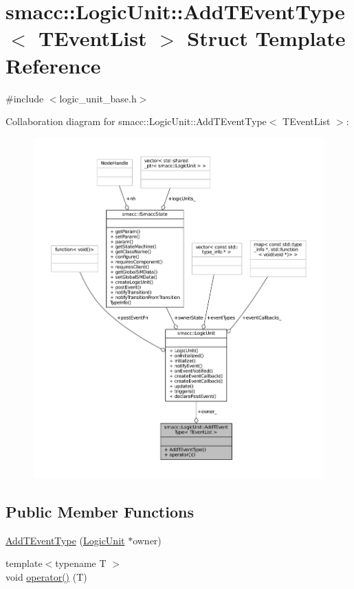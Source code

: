 \hypertarget{structsmacc_1_1LogicUnit_1_1AddTEventType}{}\section{smacc\+:\+:Logic\+Unit\+:\+:Add\+T\+Event\+Type$<$ T\+Event\+List $>$ Struct Template Reference}
\label{structsmacc_1_1LogicUnit_1_1AddTEventType}


{\ttfamily \#include $<$logic\+\_\+unit\+\_\+base.\+h$>$}



Collaboration diagram for smacc\+:\+:Logic\+Unit\+:\+:Add\+T\+Event\+Type$<$ T\+Event\+List $>$\+:
\nopagebreak
\begin{figure}[H]
\begin{center}
\leavevmode
\includegraphics[width=350pt]{structsmacc_1_1LogicUnit_1_1AddTEventType__coll__graph}
\end{center}
\end{figure}
\subsection*{Public Member Functions}
\begin{DoxyCompactItemize}
\item 
\hyperlink{structsmacc_1_1LogicUnit_1_1AddTEventType_a9eaeba0a2daf1ef60b96cee216f9383d}{Add\+T\+Event\+Type} (\hyperlink{classsmacc_1_1LogicUnit}{Logic\+Unit} $\ast$owner)
\item 
{\footnotesize template$<$typename T $>$ }\\void \hyperlink{structsmacc_1_1LogicUnit_1_1AddTEventType_a597bfed7ec443692a312a5dec3848a09}{operator()} (T)
\end{DoxyCompactItemize}
